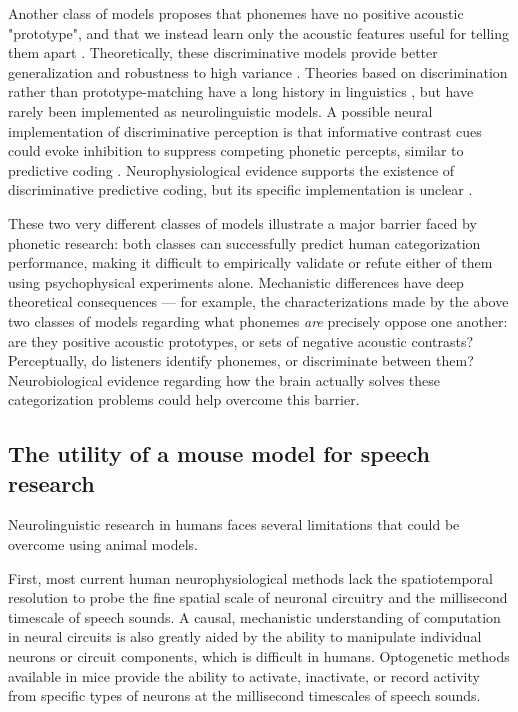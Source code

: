 Another class of models proposes that phonemes have no positive acoustic "prototype", and that we instead learn only the acoustic features useful for telling them apart \citep{Kluender2013a}. Theoretically, these discriminative models provide better generalization and robustness to high variance \citep{Ng2002a}. Theories based on discrimination rather than prototype-matching have a long history in linguistics \citep{Saussure1916}, but have rarely been implemented as neurolinguistic models. A possible neural implementation of discriminative perception is that informative contrast cues could evoke inhibition to suppress competing phonetic percepts, similar to predictive coding \citep{Rutishauser2015,Kluender2013a,Dresher2008}. Neurophysiological evidence supports the existence of discriminative predictive coding, but its specific implementation is unclear \citep{Blank2016,Gagnepain2012}.

These two very different classes of models illustrate a major barrier faced by phonetic research: both classes can successfully predict human categorization performance, making it difficult to empirically validate or refute either of them using psychophysical experiments alone. Mechanistic differences have deep theoretical consequences --- for example, the characterizations made by the above two classes of models regarding what phonemes \textit{are} precisely oppose one another: are they positive acoustic prototypes, or sets of negative acoustic contrasts? Perceptually, do listeners identify phonemes, or discriminate between them? Neurobiological evidence regarding how the brain actually solves these categorization problems could help overcome this barrier.

\subsection{The utility of a mouse model for speech research}

Neurolinguistic research in humans faces several limitations that could be overcome using animal models.

First, most current human neurophysiological methods lack the spatiotemporal resolution to probe the fine spatial scale of neuronal circuitry and the millisecond timescale of speech sounds. A causal, mechanistic understanding of computation in neural circuits is also greatly aided by the ability to manipulate individual neurons or circuit components, which is difficult in humans. Optogenetic methods available in mice provide the ability to activate, inactivate, or record activity from specific types of neurons at the millisecond timescales of speech sounds.

